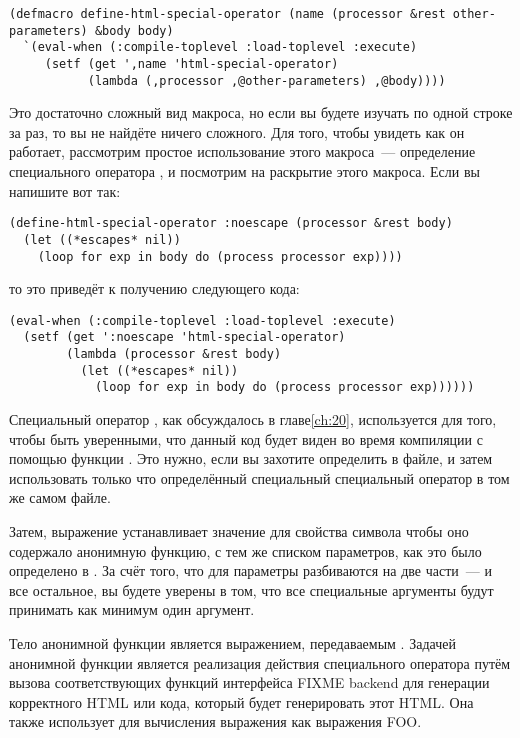 \begin{lstlisting}
(defmacro define-html-special-operator (name (processor &rest other-parameters) &body body)
  `(eval-when (:compile-toplevel :load-toplevel :execute)
     (setf (get ',name 'html-special-operator)
           (lambda (,processor ,@other-parameters) ,@body))))
\end{lstlisting}

Это достаточно сложный вид макроса, но если вы будете изучать по одной строке за раз, то
вы не найдёте ничего сложного.  Для того, чтобы увидеть как он работает, рассмотрим
простое использование этого макроса~--- определение специального оператора
, и посмотрим на раскрытие этого макроса.  Если вы напишите вот так:

\begin{lstlisting}
(define-html-special-operator :noescape (processor &rest body)
  (let ((*escapes* nil))
    (loop for exp in body do (process processor exp))))
\end{lstlisting}

то это приведёт к получению следующего кода:

\begin{lstlisting}
(eval-when (:compile-toplevel :load-toplevel :execute)
  (setf (get ':noescape 'html-special-operator)
        (lambda (processor &rest body)
          (let ((*escapes* nil))
            (loop for exp in body do (process processor exp))))))
\end{lstlisting}

Специальный оператор , как обсуждалось в главе\ref{ch:20}, используется
для того, чтобы быть уверенными, что данный код будет виден во время компиляции с помощью
функции .  Это нужно, если вы захотите определить
 в файле, и затем использовать только что определённый
специальный специальный оператор в том же самом файле.

Затем, выражение  устанавливает значение для свойства
 символа  чтобы оно содержало анонимную
функцию, с тем же списком параметров, как это было определено в
.  За счёт того, что для
 параметры разбиваются на две части~--- 
и все остальное, вы будете уверены в том, что все специальные аргументы будут принимать
как минимум один аргумент.

Тело анонимной функции является выражением, передаваемым
.  Задачей анонимной функции является реализация
действия специального оператора путём вызова соответствующих функций интерфейса FIXME
backend для генерации корректного HTML или кода, который будет генерировать этот HTML.
Она также использует  для вычисления выражения как выражения FOO.

